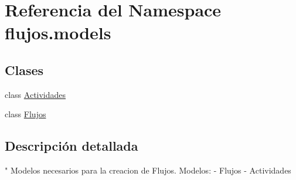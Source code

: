 \hypertarget{namespaceflujos_1_1models}{}\section{Referencia del Namespace flujos.\+models}
\label{namespaceflujos_1_1models}
\subsection*{Clases}
\begin{DoxyCompactItemize}
\item 
class \hyperlink{classflujos_1_1models_1_1_actividades}{Actividades}
\item 
class \hyperlink{classflujos_1_1models_1_1_flujos}{Flujos}
\end{DoxyCompactItemize}


\subsection{Descripción detallada}
\begin{DoxyVerb}"
Modelos necesarios para la creacion de Flujos.
Modelos:
- Flujos
- Actividades
\end{DoxyVerb}
 